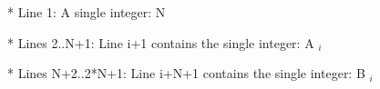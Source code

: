 * Line 1: A single integer: N  

   * Lines 2..N+1: Line i+1 contains the single integer: A   $_    i   $

   * Lines N+2..2*N+1: Line i+N+1 contains the single integer: B   $_    i   $